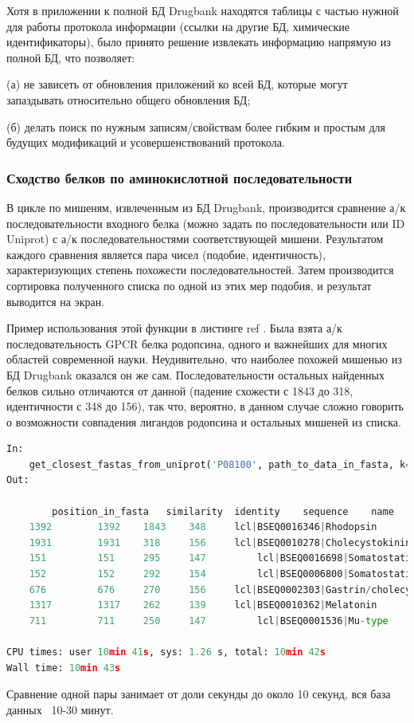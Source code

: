 \documentclass[a4paper,14pt]{article}         %
\begin{document}
Хотя в приложении к полной БД Drugbank находятся таблицы с частью нужной для работы протокола информации (ссылки на другие БД, химические идентификаторы), было принято решение извлекать информацию напрямую из полной БД, что позволяет: 

(а) не зависеть от обновления приложений ко всей БД, которые могут запаздывать относительно общего обновления БД; 

(б) делать поиск по нужным записям/свойствам более гибким и простым для будущих модификаций и усовершенствований протокола.

\subsubsection{Сходство белков по аминокислотной последовательности}

В цикле по мишеням, извлеченным из БД Drugbank, производится сравнение а/к последовательности входного белка (можно задать по последовательности или ID Uniprot) с а/к последовательностями соответствующей мишени. Результатом каждого сравнения является пара чисел (подобие, идентичность), характеризующих степень похожести последовательностей. Затем производится сортировка полученного списка по одной из этих мер подобия, и результат выводится на экран.

Пример использования этой функции в листинге \color{orange} ref
\color{black}. Была взята а/к последовательность GPCR белка родопсина, одного и важнейших для многих областей современной науки. Неудивительно, что наиболее похожей мишенью из БД Drugbank оказался он же сам. Последовательности остальных найденных белков сильно отличаются от данной (падение схожести с 1843 до 318, идентичности с 348 до 156), так что, вероятно, в данном случае сложно говорить о возможности совпадения лигандов родопсина и остальных мишеней из списка.
\begin{lstlisting}[language=Python, caption=Сходство мишеней по а/к последовательности с помощью Biopython с входными данными -- ID Uniptor белка Родопсина из семейства GPCR.]
In:
	get_closest_fastas_from_uniprot('P08100', path_to_data_in_fasta, k=0, align_matrix='blosum62', sim_or_ident=True)
Out:

	 	position_in_fasta 	similarity 	identity 	sequence 	name
	1392 	 	1392 	1843 	348  	lcl|BSEQ0016346|Rhodopsin
	1931 	 	1931 	318 	156 	lcl|BSEQ0010278|Cholecystokinin
	151 	 	151 	295 	147 		lcl|BSEQ0016698|Somatostatin
	152 	 	152 	292 	154 		lcl|BSEQ0006800|Somatostatin
	676 	 	676 	270 	156 	lcl|BSEQ0002303|Gastrin/cholecystokinin
	1317 	 	1317 	262 	139 	lcl|BSEQ0010362|Melatonin
	711 	 	711 	250 	147 		lcl|BSEQ0001536|Mu-type

CPU times: user 10min 41s, sys: 1.26 s, total: 10min 42s
Wall time: 10min 43s
\end{lstlisting}
Сравнение одной пары занимает от доли секунды до около 10 секунд, вся база данных ~10-30 минут.
\end{document}
